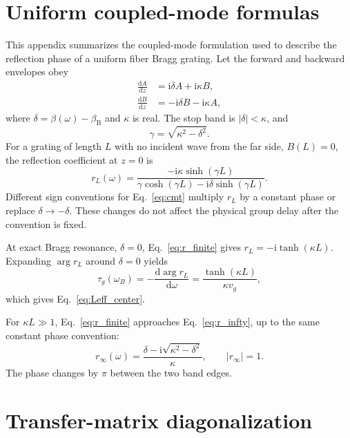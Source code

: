 \documentclass[aps,pra,twocolumn,superscriptaddress,nofootinbib]{revtex4-2}
\newcommand{\ii}{\mathrm{i}}
\newcommand{\B}{\mathrm{B}}
\newcommand{\dd}{\mathrm{d}}
\begin{document}
\section{Uniform coupled-mode formulas}
\label{app:uniform}
This appendix summarizes the coupled-mode formulation used to describe the reflection phase of a uniform fiber Bragg grating.
Let the forward and backward envelopes obey
\begin{align}
    \frac{\dd A}{\dd z}&=\ii\delta A+\ii\kappa B,\\
    \frac{\dd B}{\dd z}&=-\ii\delta B-\ii\kappa A,
    \label{eq:cmt}
\end{align}
where $\delta=\beta(\omega)-\beta_\B$ and $\kappa$ is real.  The stop band is $|\delta|<\kappa$, and
\begin{equation}
    \gamma=\sqrt{\kappa^2-\delta^2}.
\end{equation}
For a grating of length $L$ with no incident wave from the far side, $B(L)=0$, the reflection coefficient at $z=0$ is
\begin{equation}
    r_L(\omega)=\frac{-\ii\kappa\sinh(\gamma L)}{
    \gamma\cosh(\gamma L)-\ii\delta\sinh(\gamma L)}.
    \label{eq:r_finite}
\end{equation}
Different sign conventions for Eq.~\eqref{eq:cmt} multiply $r_L$ by a constant phase or replace $\delta\rightarrow-\delta$.  These changes do not affect the physical group delay after the convention is fixed.

At exact Bragg resonance, $\delta=0$, Eq.~\eqref{eq:r_finite} gives $r_L=-\ii\tanh(\kappa L)$.  Expanding $\arg r_L$ around $\delta=0$ yields
\begin{equation}
    \tau_g(\omega_B)=-\frac{\dd\arg r_L}{\dd\omega}
    =\frac{\tanh(\kappa L)}{\kappa v_g},
\end{equation}
which gives Eq.~\eqref{eq:Leff_center}.

For $\kappa L\gg1$, Eq.~\eqref{eq:r_finite} approaches Eq.~\eqref{eq:r_infty}, up to the same constant phase convention:
\begin{equation}
    r_\infty(\omega)=\frac{\delta-\ii\sqrt{\kappa^2-\delta^2}}{\kappa},
    \qquad |r_\infty|=1.
\end{equation}
The phase changes by $\pi$ between the two band edges.

\section{Transfer-matrix diagonalization}
\label{app:tmm}
\end{document}
